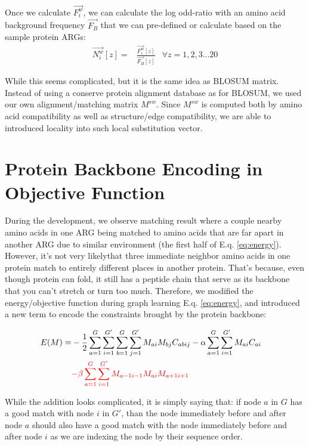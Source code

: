 Once we calculate $\overrightarrow{F^w_i}$, we can calculate the log odd-ratio with an amino acid background frequency $\overrightarrow{F_B}$ that we can pre-defined or calculate based on the sample protein ARGs:
\begin{align} 
\overrightarrow{N^w_i}[z] = & \frac{\overrightarrow{F^w_i}[z]}{\overrightarrow{F_B}[z]} & \forall z=1,2,3...20
\end{align}

While this seems complicated, but it is the same idea as BLOSUM matrix. Instead of using a conserve protein alignment database as for BLOSUM, we used our own alignment/matching matrix $M^{sw}$. Since $M^{sw}$ is computed both by amino acid compatibility as well as structure/edge compatibility, we are able to introduced locality into such local substitution vector.

\section{Protein Backbone Encoding in Objective Function}

During the development, we observe matching result where a couple nearby amino acids in one ARG being matched to amino acids that are far apart in another ARG due to similar environment (the first half of E.q. \ref{eq:energy}).\\

However, it's not very likely\footnotemark that three immediate neighbor amino acids in one protein match to entirely different places in another protein. That's because, even though protein can fold, it still has a peptide chain that serve as its backbone that you can't stretch or turn too much. Therefore, we modified the energy/objective function during graph learning E.q. \ref{eq:energy}, and introduced a new term to encode the constraints brought by the protein backbone:

\begin{align}
E(M)=&-\frac{1}{2}\sum_{a=1}^{G}\sum_{i=1}^{G'}\sum_{b=1}^{G}\sum_{j=1}^{G'}M_{ai}M_{bj}C_{abij}-\alpha\sum_{a=1}^{G}\sum_{i=1}^{G'}M_{ai}C_{ai}\nonumber\\
&\color{red}{-\beta\sum_{a=1}^{G}\sum_{i=1}^{G'}M_{a-1i-1}M_{ai}M_{a+1i+1}}&
\end{align}

While the addition looks complicated, it is simply saying that: if node $a$ in $G$ has a good match with node $i$ in $G'$, than the node immediately before and after node $a$ should also have a good match with the node immediately before and after node $i$ as we are indexing the node by their sequence order.

